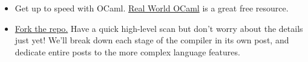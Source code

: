 \begin{itemize}
\tightlist
\item
  Get up to speed with OCaml.
  \href{https://dev.realworldocaml.org/}{Real World OCaml} is a great
  free resource.
\item
  \href{https://github.com/mukul-rathi/bolt}{Fork the repo.} Have a
  quick high-level scan but don't worry about the details just yet!
  We'll break down each stage of the compiler in its own post, and
  dedicate entire posts to the more complex language features.
\end{itemize}
%
%
%
%
%
